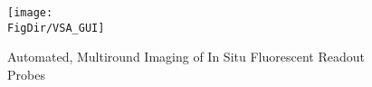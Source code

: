   \begin{figure}
    \centerline{\texttt{[image: \\FigDir/VSA\_GUI]}}
   \caption{Automated, Multiround Imaging of In Situ Fluorescent Readout Probes}
   \label{fig:VSA_GUI}
  \end{figure}


